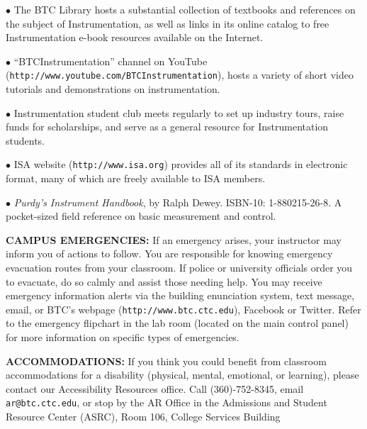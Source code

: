 \item{$\bullet$} The BTC Library hosts a substantial collection of textbooks and references on the subject of Instrumentation, as well as links in its online catalog to free Instrumentation e-book resources available on the Internet.
\item{$\bullet$} ``BTCInstrumentation'' channel on YouTube ({\tt http://www.youtube.com/BTCInstrumentation}), hosts a variety of short video tutorials and demonstrations on instrumentation.
\item{$\bullet$} Instrumentation student club meets regularly to set up industry tours, raise funds for scholarships, and serve as a general resource for Instrumentation students.
\item{$\bullet$} ISA website ({\tt http://www.isa.org}) provides all of its standards in electronic format, many of which are freely available to ISA members.
\item{$\bullet$} {\it Purdy's Instrument Handbook}, by Ralph Dewey.  ISBN-10: 1-880215-26-8.  A pocket-sized field reference on basic measurement and control.

\vskip 10pt

\noindent
{\bf CAMPUS EMERGENCIES:} If an emergency arises, your instructor may inform you of actions to follow.  You are responsible for knowing emergency evacuation routes from your classroom.  If police or university officials order you to evacuate, do so calmly and assist those needing help.  You may receive emergency information alerts via the building enunciation system, text message, email, or BTC's webpage ({\tt http://www.btc.ctc.edu}), Facebook or Twitter.  Refer to the emergency flipchart in the lab room (located on the main control panel) for more information on specific types of emergencies.

\vskip 10pt

\noindent
{\bf ACCOMMODATIONS:} If you think you could benefit from classroom accommodations for a disability (physical, mental, emotional, or learning), please contact our Accessibility Resources office.  Call (360)-752-8345, email {\tt ar@btc.ctc.edu}, or stop by the AR Office in the Admissions and Student Resource Center (ASRC), Room 106, College Services Building

\vskip 10pt




\vfil 

\eject


